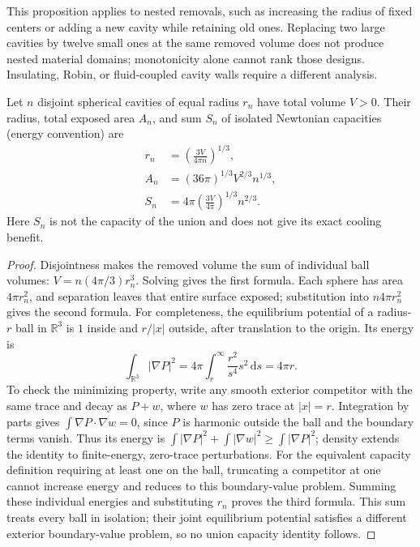 This proposition applies to nested removals, such as increasing the radius
of fixed centers or adding a new cavity while retaining old ones. Replacing
two large cavities by twelve small ones at the same removed volume does not
produce nested material domains; monotonicity alone cannot rank those designs.
Insulating, Robin, or fluid-coupled cavity walls require a different analysis.

\begin{proposition}
\label{prop:budgetgeometry}
Let $n$ disjoint spherical cavities of equal radius $r_n$ have total volume
$V>0$. Their radius, total exposed area $A_n$, and sum $S_n$ of isolated
Newtonian capacities (energy convention) are
\begin{align}
 r_n&=\left(\frac{3V}{4\pi n}\right)^{1/3},\\
 A_n&=(36\pi)^{1/3}V^{2/3}n^{1/3},\\
 S_n&=4\pi\left(\frac{3V}{4\pi}\right)^{1/3}n^{2/3}.
 \label{eq:budgetgeometry}
\end{align}
Here $S_n$ is not the capacity of the union and does not give its exact cooling
benefit.
\end{proposition}
\begin{proof}
Disjointness makes the removed volume the sum of individual ball volumes:
$V=n(4\pi/3)r_n^3$. Solving gives the first formula. Each sphere has area
$4\pi r_n^2$, and separation leaves that entire surface exposed; substitution
into $n4\pi r_n^2$ gives the second formula. For completeness, the equilibrium
potential of a radius-$r$ ball in $\mathbb R^3$ is $1$ inside and $r/|x|$
outside, after translation to the origin. Its energy is
\[
 \int_{\mathbb R^3}|\nabla P|^2
 =4\pi\int_r^\infty \frac{r^2}{s^4}s^2\,\mathrm ds=4\pi r.
\]
To check the minimizing property, write any smooth exterior competitor with
the same trace and decay as $P+w$, where $w$ has zero trace at $|x|=r$.
Integration by parts gives $\int\nabla P\cdot\nabla w=0$, since $P$ is
harmonic outside the ball and the boundary terms vanish. Thus its energy is
$\int|\nabla P|^2+\int|\nabla w|^2\ge\int|\nabla P|^2$; density extends the
identity to finite-energy, zero-trace perturbations. For the equivalent
capacity definition requiring at least one on the ball, truncating a
competitor at one cannot increase energy and reduces to this boundary-value
problem.
Summing these individual energies and substituting $r_n$ proves the third
formula. This sum treats every ball in isolation; their joint equilibrium
potential satisfies a different exterior boundary-value problem, so no union
capacity identity follows.
\end{proof}

